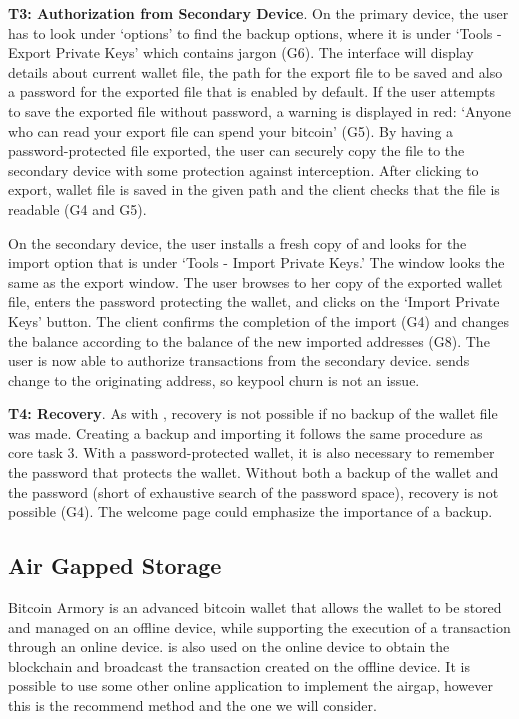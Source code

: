 
\textbf{T3: Authorization from Secondary Device}.
On the primary device, the user has to look under `options' to find the backup options, where it is under `Tools - Export Private Keys' which contains jargon (G6). The interface will display details about current wallet file, the path for the export file to be saved and also a password for the exported file that is enabled by default. If the user attempts to save the exported file without password, a warning is displayed in red: `Anyone who can read your export file can spend your bitcoin' (G5). By having a password-protected file exported, the user can securely copy the file to the secondary device with some protection against interception. After clicking to export, wallet file is saved in the given path and the client checks that the file is readable (G4 and G5). 

On the secondary device, the user installs a fresh copy of \multibit and looks for the import option that is under `Tools - Import Private Keys.' The window looks the same as the export window. The user browses to her copy of the exported wallet file, enters the password protecting the wallet, and clicks on the `Import Private Keys' button. The client confirms the completion of the import (G4) and changes the balance according to the balance of the new imported addresses (G8). The user is now able to authorize transactions from the secondary device. \multibit sends change to the originating address, so keypool churn is not an issue.


\textbf{T4: Recovery}.
As with \bitcoinclient, recovery is not possible if no backup of the wallet file was made. Creating a backup and importing it follows the same procedure as core task 3. With a password-protected wallet, it is also necessary to remember the password that protects the wallet. Without both a backup of the wallet and the password (short of exhaustive search of the password space), recovery is not possible (G4). The welcome page could emphasize the importance of a backup. 

\subsection{Air Gapped Storage}
\label{air gap}
Bitcoin Armory is an advanced bitcoin wallet that allows the wallet to be stored and managed on an offline device, while supporting the execution of a transaction through an online device. \armory is also used on the online device to obtain the blockchain and broadcast the transaction created on the offline device. It is possible to use some other online application to implement the airgap, however this is the recommend method and the one we will consider.

